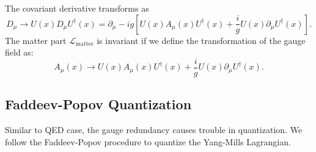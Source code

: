 \documentclass[aps,prb,superscriptaddress,nofootinbib]{revtex4}
\begin{document}
The covariant derivative transforms as
\begin{equation}
	D_\mu \rightarrow U(x) D_\mu U^\dagger(x)
	=\partial_\mu - i g \left[U(x) A_\mu(x) U^\dagger(x) + \frac{i}{g} U(x)\partial_\mu U^\dagger(x)\right].
\end{equation}
The matter part $\mathcal L_{\mathrm{matter}}$ is invariant if we define the transformation of the gauge field as:
\begin{equation}\label{eq:SM-YM-GT-1}
	A_\mu(x) \rightarrow U(x) A_\mu(x) U^\dagger(x) + \frac{i}{g} U(x)\partial_\mu U^\dagger(x).
\end{equation}



\subsection{Faddeev-Popov Quantization}
Similar to QED case, the gauge redundancy causes trouble in quantization.
We follow the Faddeev-Popov procedure to quantize the Yang-Mills Lagrangian.
\end{document}
